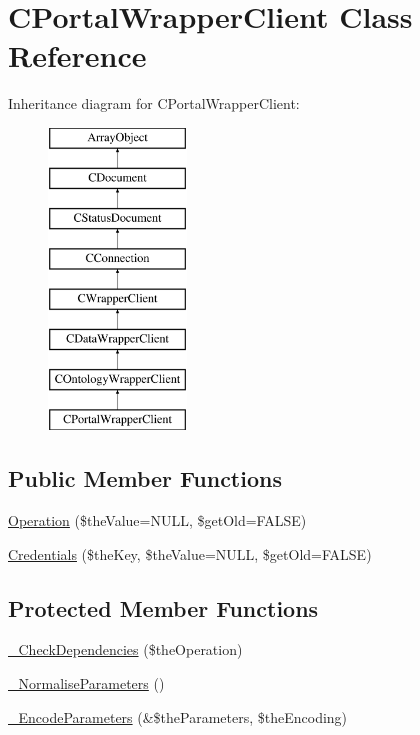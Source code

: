 \hypertarget{class_c_portal_wrapper_client}{\section{C\-Portal\-Wrapper\-Client Class Reference}
\label{class_c_portal_wrapper_client}
}
Inheritance diagram for C\-Portal\-Wrapper\-Client\-:\begin{figure}[H]
\begin{center}
\leavevmode
\includegraphics[height=8.000000cm]{class_c_portal_wrapper_client}
\end{center}
\end{figure}
\subsection*{Public Member Functions}
\begin{DoxyCompactItemize}
\item 
\hyperlink{class_c_portal_wrapper_client_aaa306c1d688a07350afc734fcaa60c9d}{Operation} (\$the\-Value=N\-U\-L\-L, \$get\-Old=F\-A\-L\-S\-E)
\item 
\hyperlink{class_c_portal_wrapper_client_a60afce66299dc26e5d51ea48fe944fd7}{Credentials} (\$the\-Key, \$the\-Value=N\-U\-L\-L, \$get\-Old=F\-A\-L\-S\-E)
\end{DoxyCompactItemize}
\subsection*{Protected Member Functions}
\begin{DoxyCompactItemize}
\item 
\hyperlink{class_c_portal_wrapper_client_aa7f24544e1e159c2eefac9b16d3bc41e}{\-\_\-\-Check\-Dependencies} (\$the\-Operation)
\item 
\hyperlink{class_c_portal_wrapper_client_abaa1c93796951da6d4cad14791014de7}{\-\_\-\-Normalise\-Parameters} ()
\item 
\hyperlink{class_c_portal_wrapper_client_a9e354d6ae8398aa27d62cd5b846b24cb}{\-\_\-\-Encode\-Parameters} (\&\$the\-Parameters, \$the\-Encoding)
\end{DoxyCompactItemize}
